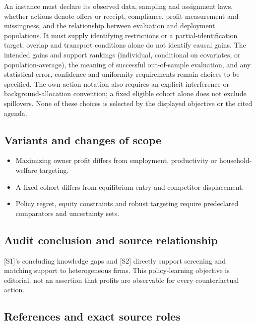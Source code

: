 \documentclass[11pt,a4paper]{article}
\begin{document}
An instance must declare its observed data, sampling and assignment laws, whether actions denote offers or receipt, compliance, profit measurement and missingness, and the relationship between evaluation and deployment populations. It must supply identifying restrictions or a partial-identification target; overlap and transport conditions alone do not identify causal gains. The intended gains and support rankings (individual, conditional on covariates, or population-average), the meaning of successful out-of-sample evaluation, and any statistical error, confidence and uniformity requirements remain choices to be specified. The own-action notation also requires an explicit interference or background-allocation convention; a fixed eligible cohort alone does not exclude spillovers. None of these choices is selected by the displayed objective or the cited agenda.

\subsection*{Variants and changes of scope}

\begin{itemize}
\item Maximizing owner profit differs from employment, productivity or household-welfare targeting.
\item A fixed cohort differs from equilibrium entry and competitor displacement.
\item Policy regret, equity constraints and robust targeting require predeclared comparators and uncertainty sets.
\end{itemize}

\subsection*{Audit conclusion and source relationship}

[S1]'s concluding knowledge gaps and [S2] directly support screening and matching support to heterogeneous firms. This policy-learning objective is editorial, not an assertion that profits are observable for every counterfactual action.

\subsection*{References and exact source roles}
\end{document}
